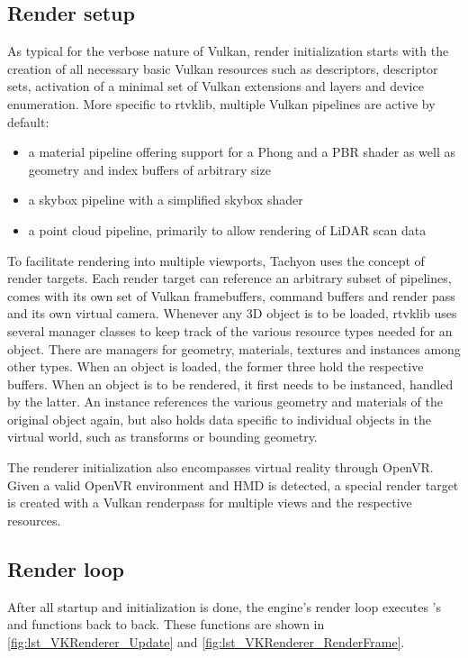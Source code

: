 \subsection{Render setup} 
As typical for the verbose nature of Vulkan, render initialization starts with the creation of all necessary basic Vulkan resources such as descriptors, descriptor sets, activation of a minimal set of Vulkan extensions and layers and device enumeration. 
More specific to rtvklib, multiple Vulkan pipelines are active by default:
\begin{itemize}
\item a material pipeline offering support for a Phong and a PBR shader as well as geometry and index buffers of arbitrary size
\item a skybox pipeline with a simplified skybox shader
\item a point cloud pipeline, primarily to allow rendering of LiDAR scan data
\end{itemize}
To facilitate rendering into multiple viewports, Tachyon uses the concept of render targets. Each render target can reference an arbitrary subset of pipelines, comes with its own set of Vulkan framebuffers, command buffers and render pass and its own virtual camera. 
Whenever any 3D object is to be loaded, rtvklib uses several manager classes to keep track of the various resource types needed for an object. There are managers for geometry, materials, textures and instances among other types. When an object is loaded, the former three hold the respective buffers. When an object is to be rendered, it first needs to be instanced, handled by the latter. An instance references the various geometry and materials of the original object again, but also holds data specific to individual objects in the virtual world, such as transforms or bounding geometry. 

The renderer initialization also encompasses virtual reality through OpenVR. Given a valid OpenVR environment and HMD is detected, a special render target is created with a Vulkan renderpass for multiple views and the respective resources. 

\subsection{Render loop} 
After all startup and initialization is done, the engine's render loop executes 's  and  functions back to back. These functions are shown in \autoref{fig:lst_VKRenderer_Update} and \autoref{fig:lst_VKRenderer_RenderFrame}. 


